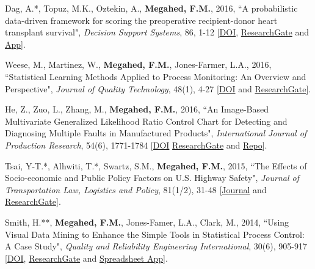 \documentclass[margin,line]{res}
\begin{document}
\begin{resume}
\vspace{-1.5mm}
Dag, A.*, Topuz, M.K., Oztekin, A., \textbf{Megahed, F.M.}, 2016, ``A probabilistic data-driven framework for scoring the preoperative recipient-donor heart transplant survival", \textit{Decision Support Systems}, 86, 1-12 [\faFile*\href{https://doi.org/10.1016/j.dss.2016.02.007}{DOI}, \faResearchgate \href{https://www.researchgate.net/publication/297599778_A_probabilistic_data-driven_framework_for_scoring_the_preoperative_recipient-donor_heart_transplant_survival}{ResearchGate} and \faDropbox \href{https://www.dropbox.com/sh/dv2waunpjw9jpik/AADwRMHTn8c9siCUh7uvZXD6a?dl=0}{App}].

\vspace{-1.5mm}
Weese, M., Martinez, W.,\textbf{ Megahed, F.M.}, Jones-Farmer, L.A., 2016, ``Statistical Learning Methods Applied to Process Monitoring: An Overview and Perspective", \textit{Journal of Quality Technology}, 48(1), 4-27 [\faFile*\href{https://doi.org/10.1080/00224065.2016.11918148}{DOI} and \faResearchgate \href{https://www.researchgate.net/publication/281647968_Statistical_Learning_Methods_Applied_to_Process_Monitoring_An_Overview_and_Perspective}{ResearchGate}].

\vspace{-1.5mm}
He, Z., Zuo, L., Zhang, M., \textbf{Megahed, F.M.}, 2016, ``An Image-Based Multivariate Generalized Likelihood Ratio Control Chart for Detecting and Diagnosing Multiple Faults in Manufactured Products", \textit{International Journal of Production Research}, 54(6), 1771-1784 [\faFile*\href{https://doi.org/10.1080/00207543.2015.1062569}{DOI} \faResearchgate \href{https://www.researchgate.net/publication/280829769_An_Image-Based_Multivariate_Generalized_Likelihood_Ratio_Control_Chart_for_Detecting_and_Diagnosing_Multiple_Faults_in_Manufactured_Products}{ResearchGate} and \faGithub \href{https://github.com/fmegahed/image-mglr}{Repo}].

\vspace{-1.5mm}
Tsai, Y-T.*,  Alhwiti, T.*,  Swartz, S.M., \textbf{Megahed, F.M.}, 2015, ``The Effects of Socio-economic and Public Policy Factors on U.S. Highway Safety", \textit{Journal of Transportation Law, Logistics and Policy}, 81(1/2), 31-48 [\faFile*\href{https://search.proquest.com/openview/132d9967de8b8b178b5230d7a3132745/1}{Journal} and \faResearchgate \href{https://www.researchgate.net/publication/281647968_Statistical_Learning_Methods_Applied_to_Process_Monitoring_An_Overview_and_Perspective}{ResearchGate}].


\vspace{-1.5mm}
Smith, H.**, \textbf{Megahed, F.M.}, Jones-Famer, L.A., Clark, M., 2014, ``Using Visual Data Mining to Enhance the Simple Tools in Statistical Process Control: A Case Study", \textit{Quality and Reliability Engineering International}, 30(6), 905-917 [\faFile*\href{https://doi.org/10.1002/qre.1706}{DOI}, \faResearchgate \href{https://www.researchgate.net/publication/305683455_Using_Visual_Data_Mining_in_Traffic_Safety_Analysis_and_Decision_Making}{ResearchGate} and \faChartBar \href{https://github.com/fmegahed/qvt/}{Spreadsheet App}].


\end{resume}
\end{document}
